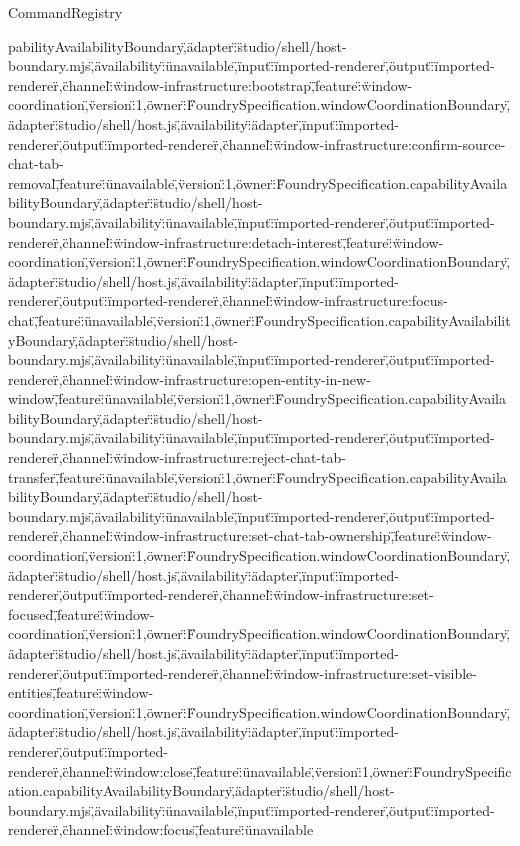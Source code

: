 \begin{lexlean}{CommandRegistry}
\begin{semanticmodule}
{pabilityAvailabilityBoundary\",\"adapter\":\"studio/shell/host-boundary.mjs\",\"availability\":\"unavailable\",\"input\":\"imported-renderer\",\"output\":\"imported-renderer\"},{\"channel\":\"window-infrastructure:bootstrap\",\"feature\":\"window-coordination\",\"version\":1,\"owner\":\"FoundrySpecification.windowCoordinationBoundary\",\"adapter\":\"studio/shell/host.js\",\"availability\":\"adapter\",\"input\":\"imported-renderer\",\"output\":\"imported-renderer\"},{\"channel\":\"window-infrastructure:confirm-source-chat-tab-removal\",\"feature\":\"unavailable\",\"version\":1,\"owner\":\"FoundrySpecification.capabilityAvailabilityBoundary\",\"adapter\":\"studio/shell/host-boundary.mjs\",\"availability\":\"unavailable\",\"input\":\"imported-renderer\",\"output\":\"imported-renderer\"},{\"channel\":\"window-infrastructure:detach-interest\",\"feature\":\"window-coordination\",\"version\":1,\"owner\":\"FoundrySpecification.windowCoordinationBoundary\",\"adapter\":\"studio/shell/host.js\",\"availability\":\"adapter\",\"input\":\"imported-renderer\",\"output\":\"imported-renderer\"},{\"channel\":\"window-infrastructure:focus-chat\",\"feature\":\"unavailable\",\"version\":1,\"owner\":\"FoundrySpecification.capabilityAvailabilityBoundary\",\"adapter\":\"studio/shell/host-boundary.mjs\",\"availability\":\"unavailable\",\"input\":\"imported-renderer\",\"output\":\"imported-renderer\"},{\"channel\":\"window-infrastructure:open-entity-in-new-window\",\"feature\":\"unavailable\",\"version\":1,\"owner\":\"FoundrySpecification.capabilityAvailabilityBoundary\",\"adapter\":\"studio/shell/host-boundary.mjs\",\"availability\":\"unavailable\",\"input\":\"imported-renderer\",\"output\":\"imported-renderer\"},{\"channel\":\"window-infrastructure:reject-chat-tab-transfer\",\"feature\":\"unavailable\",\"version\":1,\"owner\":\"FoundrySpecification.capabilityAvailabilityBoundary\",\"adapter\":\"studio/shell/host-boundary.mjs\",\"availability\":\"unavailable\",\"input\":\"imported-renderer\",\"output\":\"imported-renderer\"},{\"channel\":\"window-infrastructure:set-chat-tab-ownership\",\"feature\":\"window-coordination\",\"version\":1,\"owner\":\"FoundrySpecification.windowCoordinationBoundary\",\"adapter\":\"studio/shell/host.js\",\"availability\":\"adapter\",\"input\":\"imported-renderer\",\"output\":\"imported-renderer\"},{\"channel\":\"window-infrastructure:set-focused\",\"feature\":\"window-coordination\",\"version\":1,\"owner\":\"FoundrySpecification.windowCoordinationBoundary\",\"adapter\":\"studio/shell/host.js\",\"availability\":\"adapter\",\"input\":\"imported-renderer\",\"output\":\"imported-renderer\"},{\"channel\":\"window-infrastructure:set-visible-entities\",\"feature\":\"window-coordination\",\"version\":1,\"owner\":\"FoundrySpecification.windowCoordinationBoundary\",\"adapter\":\"studio/shell/host.js\",\"availability\":\"adapter\",\"input\":\"imported-renderer\",\"output\":\"imported-renderer\"},{\"channel\":\"window:close\",\"feature\":\"unavailable\",\"version\":1,\"owner\":\"FoundrySpecification.capabilityAvailabilityBoundary\",\"adapter\":\"studio/shell/host-boundary.mjs\",\"availability\":\"unavailable\",\"input\":\"imported-renderer\",\"output\":\"imported-renderer\"},{\"channel\":\"window:focus\",\"feature\":\"unavailable}
\end{semanticmodule}
\end{lexlean}
